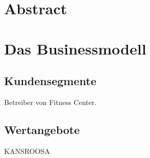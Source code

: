 

\newcommand{\SUBJECT}{Businessplan}
\newcommand{\TITLE}{GitFit}








\section{Abstract}
\cite{ackema:1998}




\section{Das Businessmodell}


\subsection{Kundensegmente}
Betreiber von Fitness Center. 

\subsection{Wertangebote}
KANSROOSA

